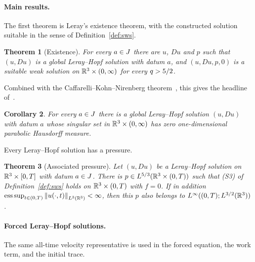 \documentclass[11pt,letterpaper]{article}
\numberwithin{equation}{section}
\theoremstyle{plain}
\newtheorem{theorem}{Theorem}[section]
\newtheorem{corollary}[theorem]{Corollary}
\theoremstyle{definition}
\theoremstyle{remark}
\begin{document}
\paragraph{Main results.}
The first theorem is Leray's existence theorem, with the constructed
solution suitable in the sense of Definition~\ref{def:sws}.

\begin{theorem}[Existence]\label{thm:leray}
For every $a\in J$ there are $u$, $Du$ and $p$ such that $(u,Du)$ is a global
Leray--Hopf solution with datum $a$, and $(u,Du,p,0)$ is a suitable weak
solution on $\mathbb{R}^3\times(0,\infty)$ for every $q>5/2$.
\end{theorem}

Combined with the Caffarelli--Kohn--Nirenberg theorem~\cite[Theorem~2.10]{CKNLean},
this gives the headline of~\cite{CKN1982}.

\begin{corollary}\label{cor:ckn-headline}
For every $a\in J$ there is a global Leray--Hopf solution $(u,Du)$ with datum
$a$ whose singular set in $\mathbb{R}^3\times(0,\infty)$ has zero one-dimensional
parabolic Hausdorff measure.
\end{corollary}

Every Leray--Hopf solution has a pressure.

\begin{theorem}[Associated pressure]\label{thm:assoc-pressure}
Let $(u,Du)$ be a Leray--Hopf solution on $\mathbb{R}^3\times[0,T]$ with datum
$a\in J$. There is $p\in L^{5/3}(\mathbb{R}^3\times(0,T))$ such that (S3) of
Definition~\ref{def:sws} holds on $\mathbb{R}^3\times(0,T)$ with $f=0$. If in
addition $\operatorname*{ess\,sup}_{t\in(0,T)}\left\lVert u(\cdot,t)\right\rVert_{L^3(\mathbb{R}^3)}<\infty$, then
this $p$ also belongs to $L^\infty((0,T);L^{3/2}(\mathbb{R}^3))$.
\end{theorem}

\paragraph{Forced Leray--Hopf solutions.}
The same all-time velocity representative is used in the forced equation,
the work term, and the initial trace.
\end{document}
